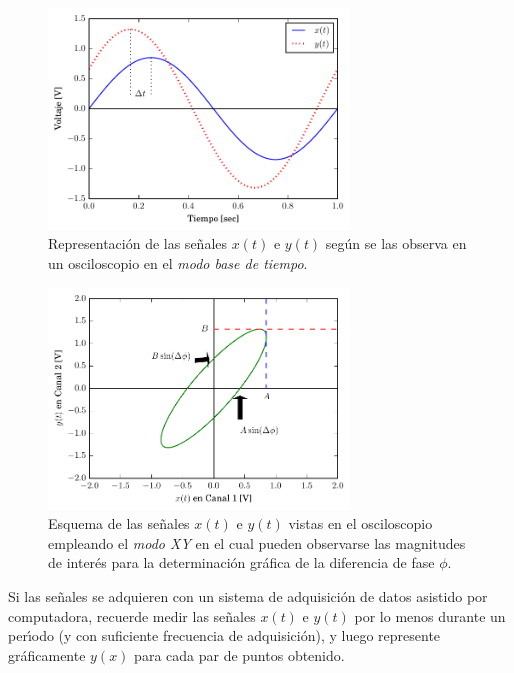 \documentclass[laboratorio]{guia}
\begin{document}
\begin{figure}[t!]
\includegraphics[width=8cm]{BaseTemporal.pdf}
\caption{Representaci\'on de las se\~nales $x(t)$ e $y(t)$ seg\'un se
las observa en un osciloscopio en el {\it modo base de tiempo}.}
\label{fig:1}
\end{figure}
\begin{figure}[t!]
\includegraphics[width=8cm]{BaseXY.pdf}
\caption{Esquema de las se\~nales $x(t)$ e $y(t)$ vistas en el osciloscopio
empleando el {\it modo XY} en el cual pueden observarse las magnitudes de
inter\'es para la determinaci\'on gr\'afica de la diferencia de fase $\phi$.}
\label{fig:2}
\end{figure}

Si las se\~nales se adquieren con un sistema de adquisici\'on de datos asistido
por computadora, recuerde medir las se\~nales $x(t)$ e $y(t)$ por lo menos
durante un per\'\i odo (y con suficiente frecuencia de adquisici\'on), y luego
represente gr\'aficamente $y(x)$ para cada par de puntos obtenido.




%  
% 
\end{document}
